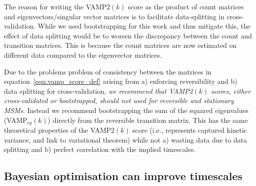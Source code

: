 \documentclass[journal=jacsat,manuscript=article]{achemso}
\begin{document}
The reason for writing the VAMP2$(k)$ score as the product of count matrices and eigenvectors/singular vector matrices is to facilitate data-splitting in cross-validation. While we used bootstrapping for this work and thus mitigate this, the effect of data splitting would be to worsen the discrepancy between the count and transition matrices. This is because the count matrices are now estimated on different data compared to the eigenvector matrices.  

Due to the problems problem of consistency between the matrices in equation~\ref{eqn:vamp_score_def} arising from a) enforcing reversibility and b) data splitting for cross-validation,  \emph{we recommend that VAMP2$(k)$ scores, either cross-validated or bootstrapped, should not used for reversible and stationary MSMs}. Instead we recommend bootstrapping the sum of the squared eigenvalues (VAMP$_{eq}(k)$) directly from the reversible transition matrix. This has the same theoretical properties of the VAMP2$(k)$ score (i.e., represents captured kinetic variance, and link to variational theorem) while not a) wasting data due to data splitting and b) perfect correlation with the implied timescales.


\subsection{Bayesian optimisation can improve timescales}\label{sec:bayes}
\end{document}
